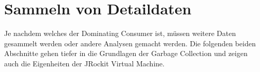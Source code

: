 \section{Sammeln von Detaildaten}
Je nachdem welches der Dominating Consumer ist, müssen weitere Daten gesammelt werden oder andere Analysen gemacht werden. Die folgenden beiden Abschnitte gehen tiefer in die Grundlagen der Garbage Collection und zeigen auch die Eigenheiten der JRockit Virtual Machine.


